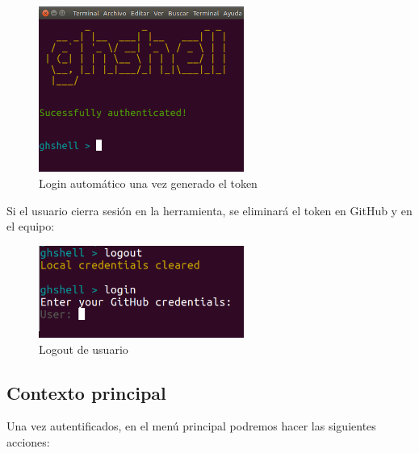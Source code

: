 		\begin{figure}[H]
		\begin{center}
		\includegraphics[width=0.6\textwidth]{images/ghshell2-4}
		\caption{Login automático una vez generado el token}
		\label{fig:ghshell2-4}
		\end{center}
		\end{figure}
		
	Si el usuario cierra sesión en la herramienta, se eliminará el token en GitHub y en el equipo:
	
		\begin{figure}[H]
		\begin{center}
		\includegraphics[width=0.6\textwidth]{images/ghshell2-2}
		\caption{Logout de usuario}
		\label{fig:ghshell2-2}
		\end{center}
		\end{figure}
		


\subsection{Contexto principal}
\label{subsec:b.2.2}

	Una vez autentificados, en el menú principal podremos hacer las siguientes acciones:
	
